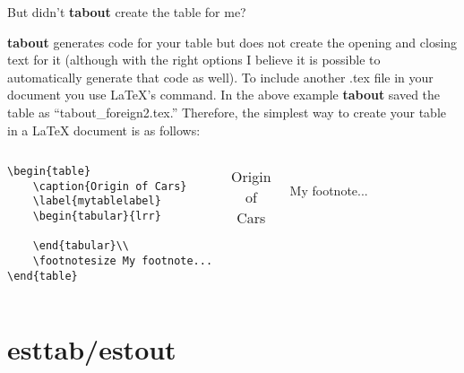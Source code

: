 \documentclass[fleqn, table, 10pt]{beamer}
\def\results{S:/trainings/exporting_stata_tables_figures/results}
\begin{document}
\begin{frame}[fragile]{But didn't \textbf{tabout} create the table for me?}

\textbf{tabout} generates code for your table but does not create the opening and closing text for it (although with the right options I believe 
    it is possible to automatically generate that code as well). To include another .tex file in your document you use \LaTeX{}'s \verb++
    command. In the above example \textbf{tabout} saved the table as ``tabout\_foreign2.tex.'' Therefore, the simplest way to create your table 
    in a \LaTeX{} document is as follows:

    \begin{columns}[t]
            {\footnotesize
            \begin{verbatim}
\begin{table}
    \caption{Origin of Cars}
    \label{mytablelabel}
    \begin{tabular}{lrr}
        
    \end{tabular}\\
    \footnotesize My footnote...
\end{table}
            \end{verbatim}
            }
        \begin{table}
            \caption{Origin of Cars}
            \label{mytablelabel}
            \begin{tabular}{lrr}
                 
            \end{tabular}\\
            \footnotesize My footnote...
        \end{table}
    \end{columns}
\end{frame}


\section{esttab/estout}
\end{document}
